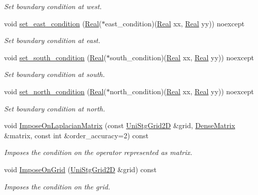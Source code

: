 \begin{DoxyCompactItemize}
\begin{DoxyCompactList}\small\item\em Set boundary condition at west. \end{DoxyCompactList}\item 
void \hyperlink{classmtk_1_1BCDescriptor2D_a4ba8690e845f59a1507b056f3fc8061e}{set\+\_\+east\+\_\+condition} (\hyperlink{group__c01-roots_gac080bbbf5cbb5502c9f00405f894857d}{Real}($\ast$east\+\_\+condition)(\hyperlink{group__c01-roots_gac080bbbf5cbb5502c9f00405f894857d}{Real} xx, \hyperlink{group__c01-roots_gac080bbbf5cbb5502c9f00405f894857d}{Real} yy)) noexcept
\begin{DoxyCompactList}\small\item\em Set boundary condition at east. \end{DoxyCompactList}\item 
void \hyperlink{classmtk_1_1BCDescriptor2D_a408f159cc44d7ee610191efb8ed48b2a}{set\+\_\+south\+\_\+condition} (\hyperlink{group__c01-roots_gac080bbbf5cbb5502c9f00405f894857d}{Real}($\ast$south\+\_\+condition)(\hyperlink{group__c01-roots_gac080bbbf5cbb5502c9f00405f894857d}{Real} xx, \hyperlink{group__c01-roots_gac080bbbf5cbb5502c9f00405f894857d}{Real} yy)) noexcept
\begin{DoxyCompactList}\small\item\em Set boundary condition at south. \end{DoxyCompactList}\item 
void \hyperlink{classmtk_1_1BCDescriptor2D_a690f6881a88b202c074d9f90f2a7ddb0}{set\+\_\+north\+\_\+condition} (\hyperlink{group__c01-roots_gac080bbbf5cbb5502c9f00405f894857d}{Real}($\ast$north\+\_\+condition)(\hyperlink{group__c01-roots_gac080bbbf5cbb5502c9f00405f894857d}{Real} xx, \hyperlink{group__c01-roots_gac080bbbf5cbb5502c9f00405f894857d}{Real} yy)) noexcept
\begin{DoxyCompactList}\small\item\em Set boundary condition at north. \end{DoxyCompactList}\item 
void \hyperlink{classmtk_1_1BCDescriptor2D_a35592617dda3b965b680b2a1355122f4}{Impose\+On\+Laplacian\+Matrix} (const \hyperlink{classmtk_1_1UniStgGrid2D}{Uni\+Stg\+Grid2\+D} \&grid, \hyperlink{classmtk_1_1DenseMatrix}{Dense\+Matrix} \&matrix, const int \&order\+\_\+accuracy=2) const 
\begin{DoxyCompactList}\small\item\em Imposes the condition on the operator represented as matrix. \end{DoxyCompactList}\item 
void \hyperlink{classmtk_1_1BCDescriptor2D_a5f0ff1fda1b5266dcd77ba2301c8ba2c}{Impose\+On\+Grid} (\hyperlink{classmtk_1_1UniStgGrid2D}{Uni\+Stg\+Grid2\+D} \&grid) const 
\begin{DoxyCompactList}\small\item\em Imposes the condition on the grid. \end{DoxyCompactList}\end{DoxyCompactItemize}
